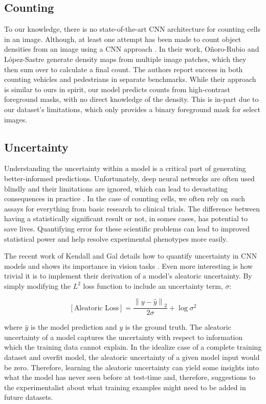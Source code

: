 \documentclass[10pt,twocolumn,letterpaper]{article}
\newcommand{\norm}[1]{\left\lVert#1\right\rVert}
\begin{document}
\subsection{Counting}
To our knowledge, there is no state-of-the-art CNN architecture for counting cells in an image.
Although, at least one attempt has been made to count object densities from an image using a CNN approach \cite{hydra}.
In their work, O\~{n}oro-Rubio and L\'{o}pez-Sastre generate density maps from multiple image
patches, which they then sum over to calculate a final count. The authors report success in both counting
vehicles and pedestrians in separate benchmarks. While their approach is similar to ours in spirit, our model
predicts counts from high-contrast foreground masks, with no direct knowledge of the density.
This is in-part due to our dataset's limitations, which only provides a binary foreground mask for select images.


\subsection{Uncertainty}

Understanding the uncertainty within a model is a critical part of generating better-informed predictions.
Unfortunately, deep neural networks are often used blindly and their limitations are ignored,
which can lead to devastating consequences in practice \cite{bayes_uncer_2017}. In the case of counting cells,
we often rely on such assays for everything from basic research to clinical trials.  The difference between
having a statistically significant result or not, in somes cases, has potential to save lives.
Quantifying error for these scientific problems can lead to improved statistical power and help resolve
experimental phenotypes more easily.

The recent work of Kendall and Gal details how to quantify uncertainty in CNN models and shows its importance in vision tasks \cite{bayes_uncer_2017}.
Even more interesting is how trivial it is to implement their derivation of a model's aleatoric uncertainty.
By simply modifying the $L^2$ loss function to include an uncertainty term, $\sigma$:

\begin{equation}\label{eq_uncer}
[\text{Aleatoric Loss}] = \frac{\norm{y - \hat{y}}_2}{2 \sigma} +  \log \sigma^2
\end{equation}

where $\hat{y}$ is the model prediction and $y$ is the ground truth.
The aleatoric uncertainty of a model captures the uncertainty with respect to information which the training data cannot explain.
In the idealize case of a complete training dataset and overfit model, the aleatoric uncertainty of a given model input would be zero.
Therefore, learning the aleatoric uncertainty can yield some insights into what the model has never seen before at test-time
and, therefore, suggestions to the experimentalist about what training examples might need to be added in future datasets.
\end{document}

